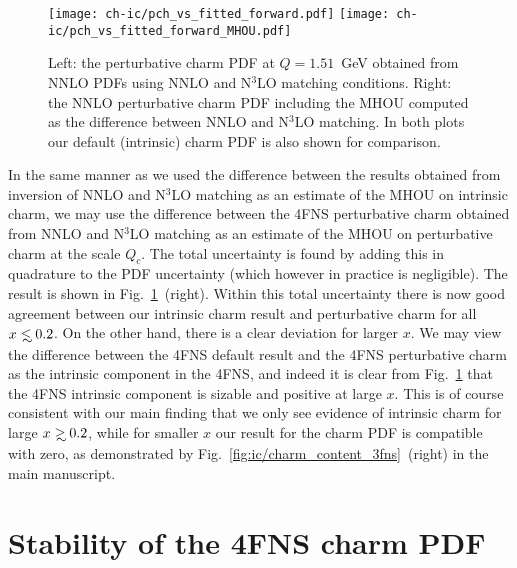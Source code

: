 \begin{figure}[h]
  \begin{center}
    \texttt{[image: ch-ic/pch\_vs\_fitted\_forward.pdf]}
    \texttt{[image: ch-ic/pch\_vs\_fitted\_forward\_MHOU.pdf]}
    \caption{\small Left: the perturbative charm PDF at $Q=1.51$~GeV
  obtained from NNLO PDFs using NNLO and N$^3$LO matching
    conditions.
      Right: the NNLO perturbative charm PDF including the MHOU
    computed as the difference between NNLO and N$^3$LO matching.
In both plots our default (intrinsic) charm PDF is also shown for comparison.  
  \label{fig:ic/charm_fitted_vs_perturbative_mhous} }
\end{center}
\end{figure}

In the same manner as we used the difference between the results obtained from
inversion of NNLO and N$^3$LO  matching as an estimate of the MHOU on
intrinsic charm, we may use the difference between the 4FNS
 perturbative charm obtained from NNLO and N$^3$LO matching as an
 estimate of the MHOU on perturbative charm at the scale $Q_c$.
 The total uncertainty is found by adding
 this in quadrature to the PDF uncertainty (which however in practice
 is negligible).
%
The result is shown in 
Fig.~\ref{fig:ic/charm_fitted_vs_perturbative_mhous}~(right).
Within this total uncertainty there is now good agreement between our
intrinsic charm result and perturbative charm for all
$x\lsim 0.2$. On the other hand, there is a clear deviation for larger
$x$. We may view the difference between the 4FNS default result
and the 4FNS perturbative  charm as the intrinsic component in the
4FNS, and indeed it is clear from
Fig.~\ref{fig:ic/charm_fitted_vs_perturbative_mhous} that the 4FNS
intrinsic component is sizable and positive at large $x$.
%
This is of course consistent with our main finding that we
only see evidence of intrinsic charm for large $x\gsim 0.2$, while for
smaller $x$ our result for the charm PDF is compatible with zero, as demonstrated by
Fig.~\ref{fig:ic/charm_content_3fns}~(right) in the main manuscript.


\section{Stability of the 4FNS charm PDF}
\label{app:ic/charm_stability_4fns}

